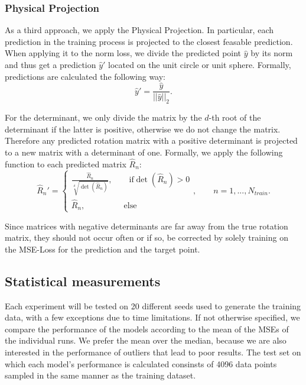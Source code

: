 \subsubsection{Physical Projection}
\label{sec:phys_proj}
As a third approach, we apply the Physical Projection. In particular, each prediction in the training process is projected to the closest feasable prediction. When applying it to the norm loss, we divide the predicted point $\hat{y}$ by its norm and thus get a prediction $\hat{y}'$ located on the unit circle or unit sphere. Formally, predictions are calculated the following way:
\begin{equation}
\hat{y}' = \frac{\hat{y}}{||\hat{y}||_2}.
\end{equation}

For the determinant, we only divide the matrix by the $d$-th root of the determinant if the latter is positive, otherwise we do not change the matrix. Therefore any predicted rotation matrix with a positive determinant is projected to a new matrix with a determinant of one. Formally, we apply the following function to each predicted matrix $\hat{R}_n$:
\begin{equation}
\hat{R}_n' = \begin{cases} \frac{\hat{R}_n}{\sqrt[d]{\det(\hat{R}_n)}}, \qquad \text{if} \det(\hat{R}_n) > 0 \\ \hat{R}_n, \qquad \qquad \,\,\,\,\text{else} \end{cases}, \qquad n = 1, ..., N_{train}.
\label{eq:norm_det}
\end{equation}

Since matrices with negative determinants are far away from the true rotation matrix, they should not occur often or if so, be corrected by solely training on the MSE-Loss for the prediction and the target point. 

\subsection{Statistical measurements}
Each experiment will be tested on 20 different seeds used to generate the training data, with a few exceptions due to time limitations. If not otherwise specified, we compare the performance of the models according to the mean of the MSEs of the individual runs. We prefer the mean over the median, because we are also interested in the performance of outliers that lead to poor results. The test set on which each model's performance is calculated consinsts of 4096 data points sampled in the same manner as the training dataset.\\



\[   \]








\clearpage

